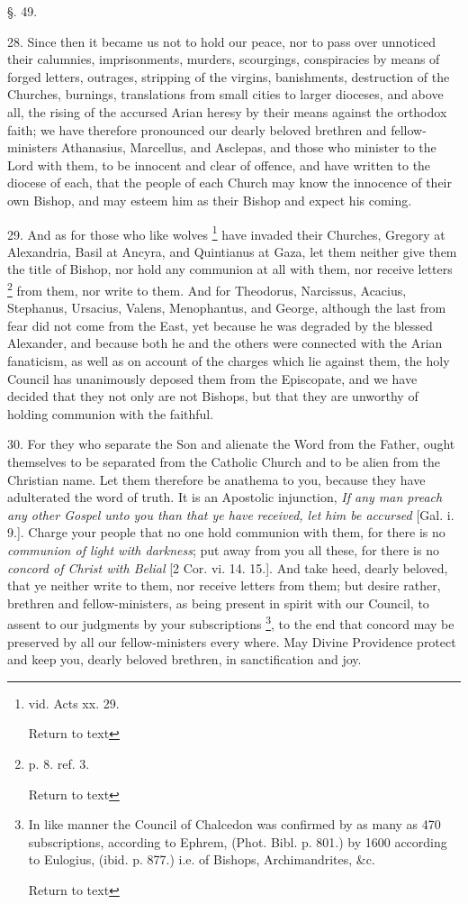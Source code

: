 §. 49.

28. Since then it became us not to hold our
peace, nor to pass over unnoticed their calumnies, imprisonments,
murders, scourgings, conspiracies by means of forged letters,
outrages, stripping of the virgins, banishments, destruction of the
Churches, burnings, translations from small cities to larger dioceses,
and above all, the rising of the accursed Arian heresy by their means
against the orthodox faith; we have therefore pronounced our dearly
beloved brethren and fellow-ministers Athanasius, Marcellus, and
Asclepas, and those who minister to the Lord with them, to be innocent
and clear of offence, and have written to the diocese of each, that
the people of each Church may know the innocence of their own Bishop,
and may esteem him as their Bishop and expect his coming.

29. And as for those who like wolves \footnote{vid. Acts xx. 29.

Return to text}
have invaded their Churches, Gregory at Alexandria, Basil at Ancyra,
and Quintianus at Gaza, let them neither give them the title of
Bishop, nor hold any communion at all with them, nor receive letters \footnote{p. 8. ref. 3.

Return to text} from them, nor write to them. And for Theodorus, Narcissus,
Acacius, Stephanus, Ursacius, Valens, Menophantus, and George,
although the last from fear did not come from the East, yet because he
was degraded by the blessed Alexander, and because both he and the
others were connected with the Arian fanaticism, as well as on account
of the charges which lie against them, the holy Council has
unanimously deposed them from the Episcopate, and we have decided that
they not only are not Bishops, but that they are unworthy of holding
communion with the faithful.

30. For they who separate the Son and alienate
the Word from the Father, ought themselves to be separated from the
Catholic Church and to be alien from the Christian name. Let them
therefore be anathema to you, because they have adulterated the word
of truth. It is an Apostolic injunction, \emph{If any man preach any
other Gospel unto you than that ye have} \emph{received, let him
be accursed} [Gal. i. 9.]. Charge your people that no one hold
communion with them, for there is no \emph{communion of light with
darkness}; put away from you all these, for there is no \emph{concord
of Christ with Belial} [2 Cor. vi. 14. 15.]. And take heed, dearly
beloved, that ye neither write to them, nor receive letters from them;
but desire rather, brethren and fellow-ministers, as being present in
spirit with our Council, to assent to our judgments by your
subscriptions \footnote{In like manner the Council of Chalcedon was
confirmed by as many as 470 subscriptions, according to Ephrem, (Phot.
Bibl. p. 801.) by 1600 according to Eulogius, (ibid. p. 877.) i.e. of
Bishops, Archimandrites, \&c.

Return to text}, to the end that concord may be preserved by
all our fellow-ministers every where. May Divine Providence protect
and keep you, dearly beloved brethren, in sanctification and joy.

